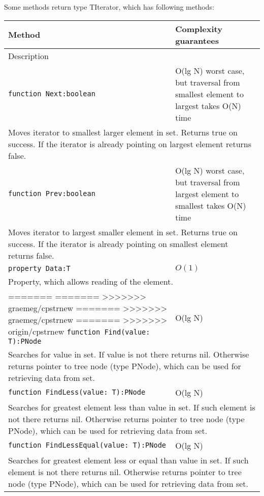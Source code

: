 Some methods return type TIterator, which has following methods:
\begin{longtable}{|m{10cm}|m{5cm}|}                                                             
\hline
Method & Complexity guarantees \\ \hline                                                  
\multicolumn{2}{|m{15cm}|}{Description} \\ \hline\hline                                               
\verb!function Next:boolean! & O(lg N) worst case, but traversal from smallest element to
largest takes O(N) time \\\hline
\multicolumn{2}{|m{15cm}|}{Moves iterator to smallest larger element in set. Returns true on
success. If the iterator is already pointing on largest element returns false.} \\\hline\hline

\verb!function Prev:boolean! & O(lg N) worst case, but traversal from largest element to
smallest takes O(N) time \\\hline
\multicolumn{2}{|m{15cm}|}{Moves iterator to largest smaller element in set. Returns true on
success. If the iterator is already pointing on smallest element returns false.} \\\hline\hline

\verb!property Data:T! & $O(1)$ \\\hline
\multicolumn{2}{|m{15cm}|}{Property, which allows reading of the element.} \\\hline
=======
=======
>>>>>>> graemeg/cpstrnew
=======
>>>>>>> graemeg/cpstrnew
=======
>>>>>>> origin/cpstrnew
\verb!function Find(value: T):PNode! & O(lg N) \\\hline
\multicolumn{2}{|m{15cm}|}{Searches for value in set. If value is not there returns nil. Otherwise
returns pointer to tree node (type PNode), which can be used for retrieving data from set.} \\\hline\hline

\verb!function FindLess(value: T):PNode! & O(lg N) \\\hline
\multicolumn{2}{|m{15cm}|}{Searches for greatest element less than value in set. If such element is not there returns nil. Otherwise
returns pointer to tree node (type PNode), which can be used for retrieving data from set.} \\\hline\hline

\verb!function FindLessEqual(value: T):PNode! & O(lg N) \\\hline
\multicolumn{2}{|m{15cm}|}{Searches for greatest element less or equal than value in set. If such element is not there returns nil. Otherwise
returns pointer to tree node (type PNode), which can be used for retrieving data from set.} \\\hline\hline


\end{longtable}
